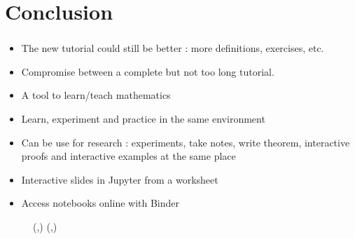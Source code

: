 \documentclass[10pt]{beamer}
\newcommand{\blue}[1]{{\color[rgb]{0,0.4,1}{#1}}}
\newcommand{\red}[1]{{\color{red}{#1}}}
\newcommand{\green}[1]{{\color[rgb]{0,0.55,0.25}{#1}}}
\newcommand{\purple}[1]{{\color[rgb]{.7,.2,1}{#1}}}
\newcommand{\orange}[1]{{\color[rgb]{1,.35,0}{#1}}}
\newcommand{\bigtableau}{\YFrench \Yboxdim{28pt}\young}
\begin{document}
\section{Conclusion}

\begin{frame}\frametitle{\orange{Conclusion}}

\begin{itemize}
	\item The new tutorial could still be better : more definitions, exercises, etc.
	\item Compromise between a complete but not too long tutorial.\newline
	
	\item A tool to learn/teach mathematics
	\item Learn, experiment and practice in the same environment
	\item Can be use for research : experiments, take notes, write theorem, interactive proofs and interactive examples at the same place
	\item Interactive slides in Jupyter from a worksheet
	\item Access notebooks online with Binder 
\end{itemize}

\end{frame}

\begin{frame}
\Huge
\begin{figure}[h]
	\bigtableau({\purple{h}}{\red{a}}{\orange{n}}{\green{k}},{\blue{T}})\hspace*{0cm} \bigtableau({\red{o}}{\orange{u}},{\purple{Y}})
\end{figure}
\end{frame}


\setcounter{lastframe}{\insertframenumber}
\setcounter{framenumber}{\thelastframe}
\end{document}
